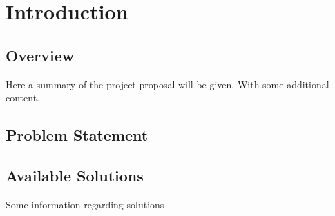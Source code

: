 \chapter{Introduction}

\section{Overview}
Here a summary of the project proposal will be given.
With some additional content.
\section{Problem Statement}

\section{Available Solutions}
Some information regarding solutions

